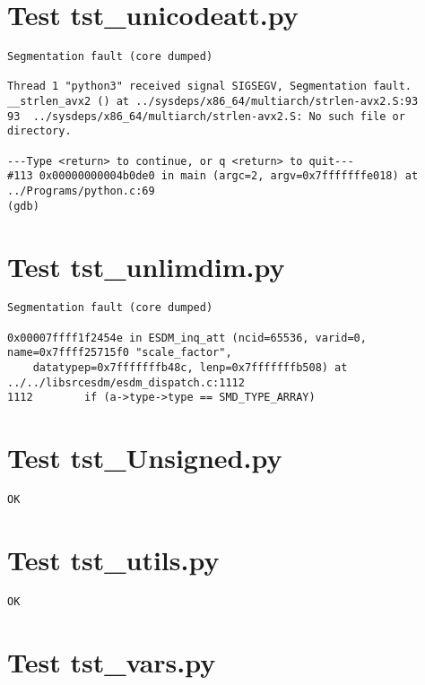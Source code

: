\section{Test tst\_unicodeatt.py}

\begin{verbatim}
Segmentation fault (core dumped)

Thread 1 "python3" received signal SIGSEGV, Segmentation fault.
__strlen_avx2 () at ../sysdeps/x86_64/multiarch/strlen-avx2.S:93
93	../sysdeps/x86_64/multiarch/strlen-avx2.S: No such file or directory.

---Type <return> to continue, or q <return> to quit---
#113 0x00000000004b0de0 in main (argc=2, argv=0x7fffffffe018) at ../Programs/python.c:69
(gdb)
\end{verbatim}

\section{Test tst\_unlimdim.py}

\begin{verbatim}
Segmentation fault (core dumped)

0x00007ffff1f2454e in ESDM_inq_att (ncid=65536, varid=0, name=0x7ffff25715f0 "scale_factor",
    datatypep=0x7fffffffb48c, lenp=0x7fffffffb508) at ../../libsrcesdm/esdm_dispatch.c:1112
1112	    if (a->type->type == SMD_TYPE_ARRAY)
\end{verbatim}

\section{Test tst\_Unsigned.py}

\begin{verbatim}
OK
\end{verbatim}

\section{Test tst\_utils.py}

\begin{verbatim}
OK
\end{verbatim}

\section{Test tst\_vars.py}


